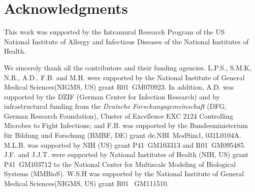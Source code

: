 
\section{Acknowledgments}


This work was supported by the Intramural Research Program of the US National Institute of Allergy and Infectious Diseases of the National Institutes of Health.

We sincerely thank all the contributors and their funding agencies. L.P.S., S.M.K, N.R., A.D., F.B. and M.H. were supported by the National Institute of General Medical Sciences(NIGMS, US) grant R01~GM070923. In addition, A.D. was supported by the DZIF (German Center for Infection Research) and by infrastructural funding from the \emph{Deutsche Forschungsgemeinschaft} (DFG, German Research Foundation), Cluster of Excellence EXC 2124 Controlling Microbes to Fight Infections; and F.B. was supported by the Bundesministerium f\"{u}r Bildung und Forschung (BMBF, DE) grant de.NBI~ModSim1, 031L0104A.
M.L.B. was supported by NIH (US) grant P41~GM103313 and R01~GM095485.
J.F. and J.J.T. were supported by National Institutes of Health (NIH, US) grant P41~GM103712 to the National Center for Multiscale Modeling of Biological Systems (MMBioS).
W.S.H was supported by the National Institute of General Medical Sciences(NIGMS, US) grant R01~ GM111510.

